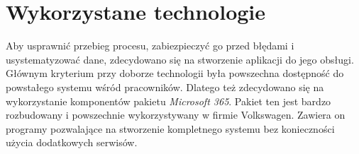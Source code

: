 \section{Wykorzystane technologie}
Aby usprawnić przebieg procesu, zabiezpieczyć go przed błędami i usystematyzować dane, zdecydowano się na stworzenie aplikacji do jego obsługi. Głównym kryterium przy doborze technologii była powszechna dostępność do powstałego systemu wśród pracowników. Dlatego też zdecydowano się na wykorzystanie komponentów pakietu \emph{Microsoft 365}. Pakiet ten jest bardzo rozbudowany i powszechnie wykorzystywany w firmie Volkswagen. Zawiera on programy pozwalające na stworzenie kompletnego systemu bez konieczności użycia dodatkowych serwisów.

